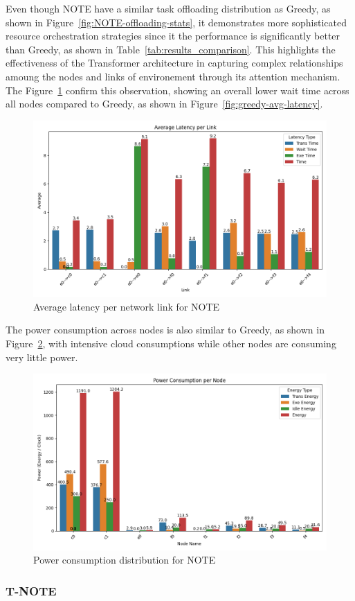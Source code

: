 \documentclass[preprint,3p,authoryear]{elsarticle}
\begin{document}
Even though NOTE have a similar task offloading distribution as Greedy, as shown in Figure~\ref{fig:NOTE-offloading-stats}, it demonstrates more sophisticated resource orchestration strategies since it the performance is significantly better than Greedy, as shown in Table~\ref{tab:results_comparison}. This highlights the effectiveness of the Transformer architecture in capturing complex relationships amoung the nodes and links of environement through its attention mechanism. The Figure~\ref{fig:T-NOTE-avg-latency} confirm this observation, showing an overall lower wait time across all nodes compared to Greedy, as shown in Figure~\ref{fig:greedy-avg-latency}.

\begin{figure}[H]
    \centering
    \includegraphics[width=0.5\linewidth]{figs/NOTE/avg_latency_per_link.png}
    \caption{Average latency per network link for NOTE}
    \label{fig:T-NOTE-avg-latency}
\end{figure}

The power consumption across nodes is also similar to Greedy, as shown in Figure~\ref{fig:T-NOTE-energy-consumption}, with intensive cloud consumptions while other nodes are consuming very little power. 
\begin{figure}[H]
    \centering
    \includegraphics[width=0.5\linewidth]{figs/NOTE/power_consumption_per_node.png}
    \caption{Power consumption distribution for NOTE}
    \label{fig:T-NOTE-energy-consumption}
\end{figure}





\subsubsection{T-NOTE}\label{subsubsec:T-NOTE-analysis}
\end{document}
